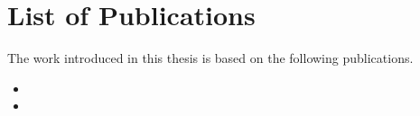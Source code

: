 \newpage
\chapter*{List of Publications}

The work introduced in this thesis is based on the following publications.

\begin{itemize} 

\item %

\item %

\end{itemize}
